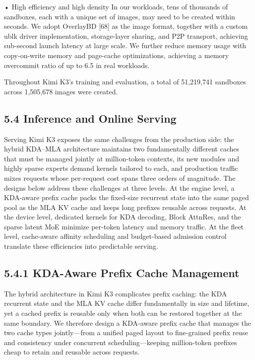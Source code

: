 \documentclass[
  10
]{article}
\begin{document}
• High efficiency and high density In our workloads, tens of thousands
of sandboxes, each with a unique set of images, may need to be created
within seconds. We adopt OverlayBD {[}68{]} as the image format,
together with a custom ublk driver implementation, storage-layer
sharing, and P2P transport, achieving sub-second launch latency at large
scale. We further reduce memory usage with copy-on-write memory and
page-cache optimizations, achieving a memory overcommit ratio of up to
6.5 in real workloads.

Throughout Kimi K3's training and evaluation, a total of 51,219,741
sandboxes across 1,505,678 images were created.

\subsection{5.4 Inference and Online
Serving}\label{inference-and-online-serving}

Serving Kimi K3 exposes the same challenges from the production side:
the hybrid KDA--MLA architecture maintains two fundamentally different
caches that must be managed jointly at million-token contexts, its new
modules and highly sparse experts demand kernels tailored to each, and
production traffic mixes requests whose per-request cost spans three
orders of magnitude. The designs below address these challenges at three
levels. At the engine level, a KDA-aware prefix cache packs the
fixed-size recurrent state into the same paged pool as the MLA KV cache
and keeps long prefixes reusable across requests. At the device level,
dedicated kernels for KDA decoding, Block AttnRes, and the sparse latent
MoE minimize per-token latency and memory traffic. At the fleet level,
cache-aware affinity scheduling and budget-based admission control
translate these efficiencies into predictable serving.

\subsection{5.4.1 KDA-Aware Prefix Cache
Management}\label{kda-aware-prefix-cache-management}

The hybrid architecture in Kimi K3 complicates prefix caching: the KDA
recurrent state and the MLA KV cache differ fundamentally in size and
lifetime, yet a cached prefix is reusable only when both can be restored
together at the same boundary. We therefore design a KDA-aware prefix
cache that manages the two cache types jointly---from a unified paged
layout to fine-grained prefix reuse and consistency under concurrent
scheduling---keeping million-token prefixes cheap to retain and reusable
across requests.
\end{document}
